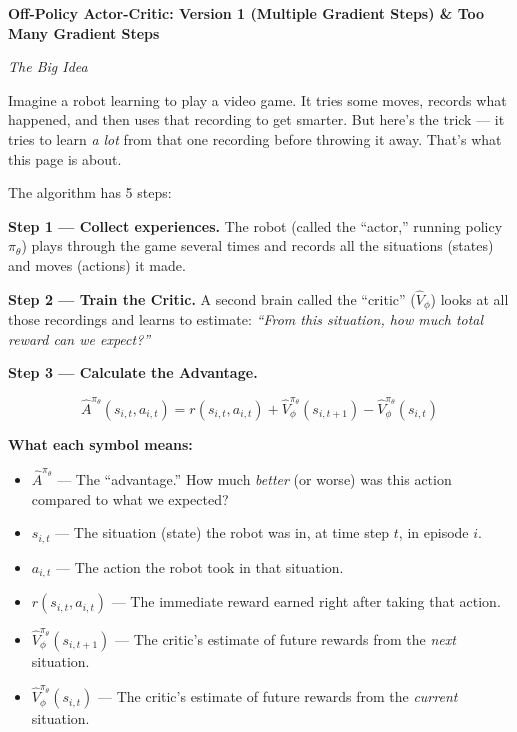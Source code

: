 \bigskip

\textbf{Off-Policy Actor-Critic: Version 1 (Multiple Gradient Steps) \& Too Many Gradient Steps}

\bigskip

\textit{The Big Idea}

Imagine a robot learning to play a video game. It tries some moves, records what happened,
and then uses that recording to get smarter. But here's the trick --- it tries to learn
\textit{a lot} from that one recording before throwing it away. That's what this page is about.

The algorithm has 5 steps:

\bigskip

\textbf{Step 1 --- Collect experiences.}
The robot (called the ``actor,'' running policy $\pi_\theta$) plays through the game several
times and records all the situations (states) and moves (actions) it made.

\bigskip

\textbf{Step 2 --- Train the Critic.}
A second brain called the ``critic'' ($\hat{V}_\phi$) looks at all those recordings and learns
to estimate: \textit{``From this situation, how much total reward can we expect?''}

\bigskip

\textbf{Step 3 --- Calculate the Advantage.}

\[
\hat{A}^{\pi_\theta}(s_{i,t}, a_{i,t}) = r(s_{i,t}, a_{i,t}) + \hat{V}_\phi^{\pi_\theta}(s_{i,t+1}) - \hat{V}_\phi^{\pi_\theta}(s_{i,t})
\]

\textbf{What each symbol means:}
\begin{itemize}
    \item $\hat{A}^{\pi_\theta}$ --- The ``advantage.'' How much \textit{better} (or worse) was this action compared to what we expected?
    \item $s_{i,t}$ --- The situation (state) the robot was in, at time step $t$, in episode $i$.
    \item $a_{i,t}$ --- The action the robot took in that situation.
    \item $r(s_{i,t}, a_{i,t})$ --- The immediate reward earned right after taking that action.
    \item $\hat{V}_\phi^{\pi_\theta}(s_{i,t+1})$ --- The critic's estimate of future rewards from the \textit{next} situation.
    \item $\hat{V}_\phi^{\pi_\theta}(s_{i,t})$ --- The critic's estimate of future rewards from the \textit{current} situation.
\end{itemize}

